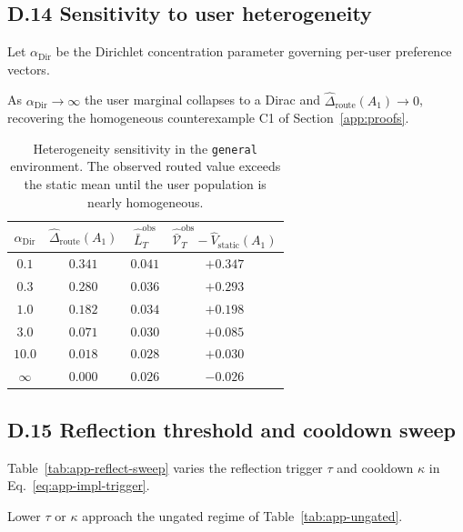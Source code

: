 \documentclass{article} %
\begin{document}
\subsection{D.14 Sensitivity to user heterogeneity}

\label{app:tab-alpha}

Let $\alpha_{\mathrm{Dir}}$ be the Dirichlet concentration parameter governing per-user preference vectors.

As $\alpha_{\mathrm{Dir}} \to \infty$ the user marginal collapses to a Dirac and $\widehat\Delta_{\mathrm{route}}(A_1) \to 0$, recovering the homogeneous counterexample C1 of Section~\ref{app:proofs}.

\begin{table}[h]
\centering
\small
\begin{tabular}{cccc}
\toprule
$\alpha_{\mathrm{Dir}}$ & $\widehat\Delta_{\mathrm{route}}(A_1)$ & $\widehat{\bar L}_T^{\mathrm{obs}}$ & $\widehat{\bar{\mathcal V}}_T^{\mathrm{obs}} - \widehat V_{\mathrm{static}}(A_1)$ \\
\midrule
$0.1$  & $0.341$ & $0.041$ & $+0.347$ \\
$0.3$  & $0.280$ & $0.036$ & $+0.293$ \\
$1.0$  & $0.182$ & $0.034$ & $+0.198$ \\
$3.0$  & $0.071$ & $0.030$ & $+0.085$ \\
$10.0$ & $0.018$ & $0.028$ & $+0.030$ \\
$\infty$ & $0.000$ & $0.026$ & $-0.026$ \\
\bottomrule
\end{tabular}
\caption{Heterogeneity sensitivity in the \texttt{general} environment. The
observed routed value exceeds the static mean until the user population is
nearly homogeneous.}
\label{tab:app-alpha}
\end{table}

\subsection{D.15 Reflection threshold and cooldown sweep}

\label{app:tab-reflect-sweep}

Table~\ref{tab:app-reflect-sweep} varies the reflection trigger \(\tau\) and
cooldown \(\kappa\) in Eq.~\eqref{eq:app-impl-trigger}.

Lower $\tau$ or $\kappa$ approach the ungated regime of Table~\ref{tab:app-ungated}.
\end{document}
